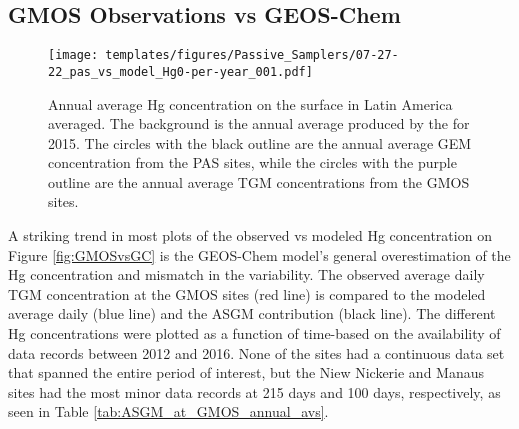 \subsection{GMOS Observations vs GEOS-Chem}
\begin{figure}[H]
\centering
  \texttt{[image: templates/figures/Passive\_Samplers/07-27-22\_pas\_vs\_model\_Hg0-per-year\_001.pdf]}
  \caption{Annual average Hg concentration on the surface in Latin America averaged. The background is the annual average \hgc produced by the \on for 2015. The circles with the black outline are the annual average GEM concentration from the PAS sites, while the circles with the purple outline are the annual average TGM concentrations from the GMOS sites.}
  \label{fig:06-12-22_pas_vs_model_Hg0-per-year_001}
  
  
\end{figure}
\FloatBarrier
\begin{flushleft}
A striking trend in most plots of the observed vs modeled Hg concentration on Figure \ref{fig:GMOSvsGC} is the GEOS-Chem model's general overestimation of the Hg concentration and mismatch in the variability. The observed average daily TGM concentration at the GMOS sites (red line) is compared to the modeled \on average daily \hg (blue line) and the ASGM contribution (black line). The different Hg concentrations were plotted as a function of time-based on the availability of data records between 2012 and 2016. None of the sites had a continuous data set that spanned the entire period of interest, but the Niew Nickerie and Manaus sites had the most minor data records at 215 days and 100 days, respectively, as seen in Table \ref{tab:ASGM_at_GMOS_annual_avs}.   
\end{flushleft}


                        
